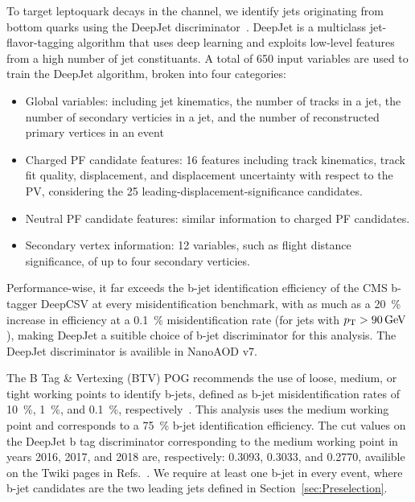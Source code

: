 To target leptoquark decays in the \mumubj channel, we identify jets originating from bottom quarks using the DeepJet discriminator~\cite{DeepJet}. DeepJet is a multiclass jet-flavor-tagging algorithm that uses deep learning and exploits low-level features from a high number of jet constituants. A total of 650 input variables are used to train the DeepJet algorithm, broken into four categories: 
\begin{itemize}
    \item Global variables: including jet kinematics, the number of tracks in a jet, the number of secondary verticies in a jet, and  the number of reconstructed primary vertices in an event
    \item Charged PF candidate features: 16 features including track kinematics, track fit quality, displacement, and displacement uncertainty with respect to the PV, considering the 25 leading-displacement-significance candidates.
    \item Neutral PF candidate features: similar information to charged PF candidates.
    \item Secondary vertex information: 12 variables, such as flight distance significance, of up to four secondary verticies.
\end{itemize}

Performance-wise, it far exceeds the b-jet identification efficiency of the CMS b-tagger DeepCSV at every misidentification benchmark, with as much as a \SI{20}{\%} increase in efficiency at a \SI{0.1}{\%} misidentification rate (for jets with $\pt > \SI{90}{\GeV}$), making DeepJet a suitible choice of b-jet discriminator for this analysis. The DeepJet discriminator is availible in NanoAOD v7.

The B Tag \& Vertexing (BTV) POG recommends the use of loose, medium, or tight working points to identify b-jets, defined as b-jet misidentification rates of \SI{10}{\%}, \SI{1}{\%}, and \SI{0.1}{\%}, respectively~\cite{BTagID}. This analysis uses the medium working point and corresponds to a \SI{75}{\%} b-jet identification efficiency. The cut values on the DeepJet b tag discriminator corresponding to the medium working point in years 2016, 2017, and 2018 are, respectively: 0.3093, 0.3033, and 0.2770, availible on the Twiki pages in Refs.~\cite{BtagTwiki2016}\cite{BtagTwiki2017}\cite{BtagTwiki2018}. We require at least one b-jet in every event, where b-jet candidates are the two leading jets defined in Section~\ref{sec:Preselection}.